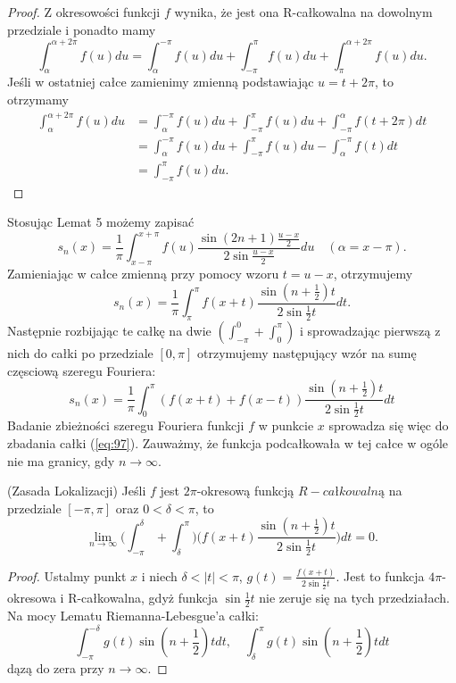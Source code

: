 \documentclass[leqno]{article}
\begin{document}
\begin{justify}
\begin{proof}
    Z okresowości funkcji $f$ wynika, że jest ona R-całkowalna na dowolnym przedziale i ponadto mamy 
    \[
        \int_{\alpha}^{\alpha + 2\pi} f(u) du = \int_{\alpha}^{-\pi}f(u)du + \int_{-\pi}^{\pi}f(u)du + \int_{\pi}^{\alpha + 2\pi} f(u)du.
    \]
    Jeśli w ostatniej całce zamienimy zmienną podstawiając $u = t + 2\pi$, to otrzymamy 
    \begin{align*}
        \int_{\alpha}^{\alpha + 2\pi} f(u) du &= \int_{\alpha}^{-\pi}f(u)du + \int_{-\pi}^{\pi}f(u)du + \int_{-\pi}^{\alpha} f(t + 2\pi)dt \\
        &= \int_{\alpha}^{-\pi}f(u)du + \int_{-\pi}^{\pi}f(u)du - \int_{\alpha}^{-\pi}f(t)dt \\
        &= \int_{-\pi}^{\pi}f(u)du. 
    \end{align*}
   
\end{proof}

Stosując Lemat 5 możemy zapisać 
\[
    s_n(x) = \frac{1}{\pi}\int_{x-\pi}^{x+\pi} f(u) \frac{\sin (2n + 1) \frac{u-x}{2}}{2 \sin \frac{u-x}{2}}du \quad (\alpha = x - \pi).
\]
Zamieniając w całce zmienną przy pomocy wzoru $t = u - x$, otrzymujemy 
\[
    s_n(x) = \frac{1}{\pi}\int_{\pi}^{\pi}f(x + t) \frac{\sin (n + \frac{1}{2})t}{2 \sin \frac{1}{2}t}dt.
\]
Następnie rozbijając te całkę na dwie $(\int_{-\pi}^{0} + \int_{0}^{\pi})$ i sprowadzając pierwszą z nich do całki po przedziale $[0, \pi]$ otrzymujemy następujący wzór na sumę częsciową szeregu Fouriera:
\begin{equation}\label{eq:97}
    s_n(x) = \frac{1}{\pi}\int_{0}^{\pi}(f(x + t) + f(x - t))\frac{\sin (n + \frac{1}{2})t}{2 \sin \frac{1}{2}t}dt
\end{equation}
Badanie zbieżności szeregu Fouriera funkcji $f$ w punkcie $x$ sprowadza się więc do zbadania całki (\ref{eq:97}). Zauważmy, że funkcja podcałkowała w tej całce w ogóle nie ma granicy, gdy $n \to \infty$.
    
\begin{theorem}
{
    (Zasada Lokalizacji) Jeśli $f$ jest $2\pi$-okresową funkcją $R-całkowalną$ na przedziale $[-\pi, \pi]$ oraz $0 < \delta < \pi$, to 
    \[
        \lim_{n \to \infty} \Bigg( \int_{-\pi}^{\delta}+ \int_{\delta}^{\pi}\Bigg)\Bigg( f(x + t) \frac{\sin (n + \frac{1}{2})t}{2 \sin \frac{1}{2}t}\Bigg)dt = 0.
    \]
}
\end{theorem}

\begin{proof}
    Ustalmy punkt $x$ i niech $\delta < |t| < \pi$, $g(t) = \frac{f(x+t)}{2 \sin \frac{1}{2}t}$. Jest to funkcja $4\pi$-okresowa i R-całkowalna, gdyż funkcja $\sin \frac{1}{2}t$
    nie zeruje się na tych przedziałach. Na mocy Lematu Riemanna-Lebesgue'a całki:
    \[
        \int_{-\pi}^{-\delta} g(t) \sin (n + \frac{1}{2})t dt, \quad \int_{\delta}^{\pi}g(t) \sin (n + \frac{1}{2})t dt
    \]
    dązą do zera przy $n \to \infty$.
\end{proof}


\end{justify}
\end{document}
